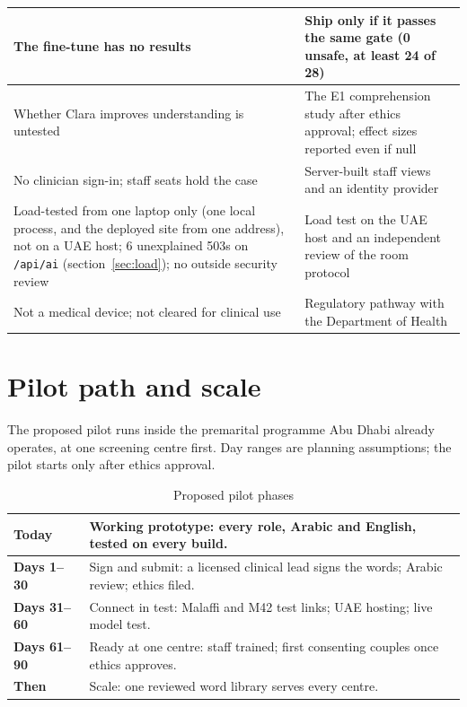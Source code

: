 \documentclass[10.5pt,a4paper]{article}
\newcommand{\chapterbreak}{}
\let\oldsection\section
\renewcommand{\section}{\chapterbreak\oldsection}
\newcommand{\toprl}{\arrayrulecolor{ink}\toprule\arrayrulecolor{rule}}
\newcommand{\code}[1]{\texttt{\small #1}}
\begin{document}
{\begin{xltabular}{\textwidth}{@{}LL@{}}
\midrule
The fine-tune has no results & Ship only if it passes the same gate (0 unsafe, at least 24 of 28)\\
\midrule
Whether Clara improves understanding is untested & The E1 comprehension study after ethics approval; effect sizes reported even if null\\
\midrule
No clinician sign-in; staff seats hold the case & Server-built staff views and an identity provider\\
\midrule
Load-tested from one laptop only (one local process, and the deployed site from one address), not on a UAE host; 6 unexplained 503s on \code{/api/ai} (section~\ref{sec:load}); no outside security review & Load test on the UAE host and an independent review of the room protocol\\
\midrule
Not a medical device; not cleared for clinical use & Regulatory pathway with the Department of Health\\
\bottomrule
\end{xltabular}}

\section{Pilot path and scale}

The proposed pilot runs inside the premarital programme Abu Dhabi already operates, at one screening centre first. Day
ranges are planning assumptions; the pilot starts only after ethics approval.

{\small
\begin{xltabular}{\textwidth}{@{}P{3cm}L@{}}
\caption{Proposed pilot phases}\\
\toprl
\textbf{Today} & Working prototype: every role, Arabic and English, tested on every build.\\
\midrule
\textbf{Days 1–30} & Sign and submit: a licensed clinical lead signs the words; Arabic review; ethics filed.\\
\midrule
\textbf{Days 31–60} & Connect in test: Malaffi and M42 test links; UAE hosting; live model test.\\
\midrule
\textbf{Days 61–90} & Ready at one centre: staff trained; first consenting couples once ethics approves.\\
\midrule
\textbf{Then} & Scale: one reviewed word library serves every centre.\\
\bottomrule
\end{xltabular}}
\end{document}
